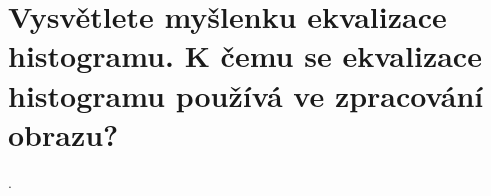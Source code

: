 \section{Vysvětlete myšlenku ekvalizace histogramu. K čemu se ekvalizace histogramu používá ve zpracování obrazu?}.